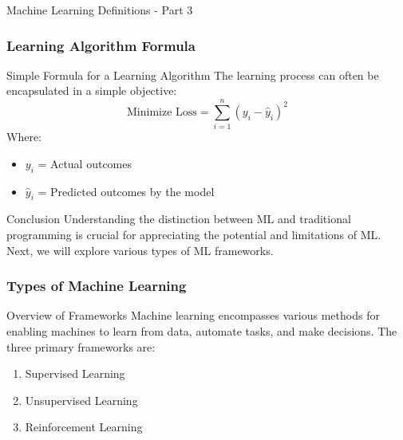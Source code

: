 \documentclass[aspectratio=169]{beamer}
\begin{document}
\begin{frame}[fragile]{Machine Learning Definitions - Part 3}
  \frametitle{Learning Algorithm Formula}
  \begin{block}{Simple Formula for a Learning Algorithm}
    The learning process can often be encapsulated in a simple objective:
    \begin{equation}
      \text{Minimize Loss} = \sum\limits_{i=1}^{n} (y_i - \hat{y}_i)^2
    \end{equation}
    Where:
    \begin{itemize}
      \item $y_i$ = Actual outcomes
      \item $\hat{y}_i$ = Predicted outcomes by the model
    \end{itemize}
  \end{block}
  
  \begin{block}{Conclusion}
    Understanding the distinction between ML and traditional programming is crucial for appreciating the potential and limitations of ML. Next, we will explore various types of ML frameworks.
  \end{block}
\end{frame}

\begin{frame}[fragile]
    \frametitle{Types of Machine Learning}
    \begin{block}{Overview of Frameworks}
        Machine learning encompasses various methods for enabling machines to learn from data, automate tasks, and make decisions. The three primary frameworks are:
    \end{block}
    \begin{enumerate}
        \item Supervised Learning
        \item Unsupervised Learning
        \item Reinforcement Learning
    \end{enumerate}
\end{frame}
\end{document}
